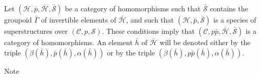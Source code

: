 \documentclass[a4paper,oneside,nobib,nofonts,notitlepage,notoc,nols,fleqn,justified]{tufte-book}
\newcommand{\oldpage}[1]{{\reversemarginpar\marginnote{\raggedleft\footnotesize\textit{p.~#1}}}}
\newcommand{\CC}{\mathcal{C}}
\newcommand{\HH}{\mathcal{H}}
\renewcommand{\SS}{\mathcal{S}}
\begin{document}
Let $(\HH,\bar{p},\bar{\HH},\bar{\SS})$ be a category of homomorphisms such that $\bar{\SS}$ contains the groupoid $\bar{\Gamma}$ of invertible elements of $\bar{\HH}$, and such that $(\HH,\bar{p},\bar{\SS})$ is a species of superstructures \cite{3a} over $(\CC,p,\SS)$.
\oldpage{373}
These conditions imply that $(\CC,p\bar{p},\bar{\HH},\bar{\SS})$ is a category of homomorphisms.
An element $\bar{h}$ of $\bar{\HH}$ will be denoted either by the triple $(\beta(\bar{h}),\bar{p}(\bar{h}),\alpha(\bar{h}))$ or by the triple $(\beta(\bar{h}),p\bar{p}(\bar{h}),\alpha(\bar{h}))$.

Note





\nocite{*}

\begingroup
\let\clearpage\relax
\begin{fullwidth}
  \printbibliography[notkeyword={oc},heading=bibintoc,title=Bibliography]

  \printbibliography[keyword={oc},heading=bibintoc,title={Bibliography from the collected works}]
\end{fullwidth}
\endgroup
\end{document}
